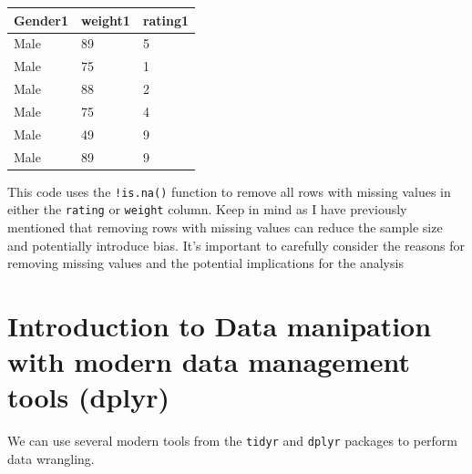 \documentclass[
]{article}
\newenvironment{Shaded}{\begin{snugshade}}{\end{snugshade}}
\newcommand{\CommentTok}[1]{\textcolor[rgb]{0.56,0.35,0.01}{\textit{#1}}}
\newcommand{\FunctionTok}[1]{\textcolor[rgb]{0.13,0.29,0.53}{\textbf{#1}}}
\newcommand{\NormalTok}[1]{#1}
\newcommand{\OtherTok}[1]{\textcolor[rgb]{0.56,0.35,0.01}{#1}}
\newcommand{\SpecialCharTok}[1]{\textcolor[rgb]{0.81,0.36,0.00}{\textbf{#1}}}
\begin{document}
\begin{Shaded}
\end{Shaded}

\begin{longtable}[]{@{}lll@{}}
\toprule\noalign{}
Gender1 & weight1 & rating1 \\
\midrule\noalign{}
\endhead
\bottomrule\noalign{}
\endlastfoot
Male & 89 & 5 \\
Male & 75 & 1 \\
Male & 88 & 2 \\
Male & 75 & 4 \\
Male & 49 & 9 \\
Male & 89 & 9 \\
\end{longtable}

This code uses the \texttt{!is.na()} function to remove all rows with
missing values in either the \texttt{rating} or \texttt{weight} column.
Keep in mind as I have previously mentioned that removing rows with
missing values can reduce the sample size and potentially introduce
bias. It's important to carefully consider the reasons for removing
missing values and the potential implications for the analysis

\hypertarget{introduction-to-data-manipation-with-modern-data-management-tools-dplyr}{%
\section{Introduction to Data manipation with modern data management
tools
(dplyr)}\label{introduction-to-data-manipation-with-modern-data-management-tools-dplyr}}

We can use several modern tools from the \texttt{tidyr} and
\texttt{dplyr} packages to perform data wrangling.
\end{document}
